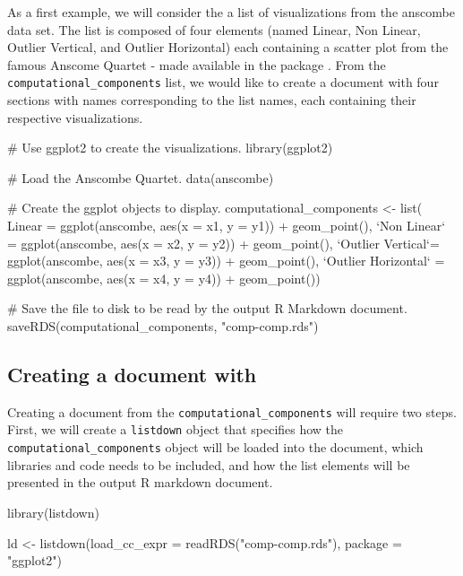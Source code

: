 As a first example, we will consider the a list of visualizations from
the anscombe data set. The list is composed of four 
\citep{wickham2016}elements (named Linear, Non Linear, Outlier Vertical,
and Outlier Horizontal) each containing a scatter plot from the famous
Anscome Quartet - made available in the  package
\citep{R}. From the \texttt{computational\_components} list, we would
like to create a document with four sections with names corresponding to
the list names, each containing their respective visualizations.

\begin{Schunk}
\begin{Sinput}
# Use ggplot2 to create the visualizations.
library(ggplot2)

# Load the Anscombe Quartet.
data(anscombe)

# Create the ggplot objects to display.
  computational_components <- list(
    Linear = ggplot(anscombe, aes(x = x1, y = y1)) + geom_point(),
    `Non Linear` = ggplot(anscombe, aes(x = x2, y = y2)) + geom_point(),
    `Outlier Vertical`= ggplot(anscombe, aes(x = x3, y = y3)) + geom_point(),
    `Outlier Horizontal` =  ggplot(anscombe, aes(x = x4, y = y4)) + geom_point())

# Save the file to disk to be read by the output R Markdown document.
saveRDS(computational_components, "comp-comp.rds")
\end{Sinput}
\end{Schunk}

\hypertarget{creating-a-document-with}{%
\subsection{\texorpdfstring{Creating a document with
}{Creating a document with }}\label{creating-a-document-with}}

Creating a document from the \texttt{computational\_components} will
require two steps. First, we will create a \texttt{listdown} object that
specifies how the \texttt{computational\_components} object will be
loaded into the document, which libraries and code needs to be included,
and how the list elements will be presented in the output R markdown
document.

\begin{Schunk}
\begin{Sinput}
library(listdown)

ld <- listdown(load_cc_expr = readRDS("comp-comp.rds"),
               package = "ggplot2")
\end{Sinput}
\end{Schunk}

